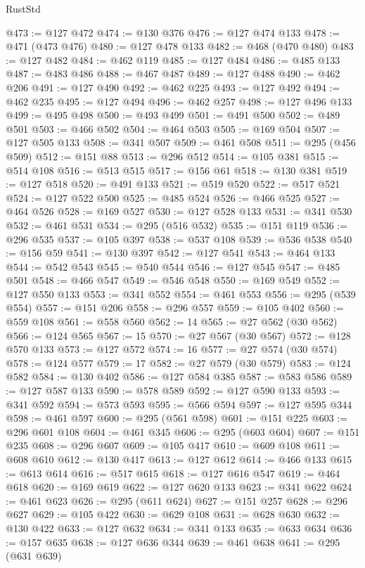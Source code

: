 \begin{lexlean}{RustStd}
\begin{coremodule}
@473 := @127 @472
@474 := @130 @376
@476 := @127 @474 @133
@478 := @471 (@473 @476)
@480 := @127 @478 @133
@482 := @468 (@470 @480)
@483 := @127 @482
@484 := @462 @119
@485 := @127 @484
@486 := @485 @133
@487 := @483 @486
@488 := @467 @487
@489 := @127 @488
@490 := @462 @206
@491 := @127 @490
@492 := @462 @225
@493 := @127 @492
@494 := @462 @235
@495 := @127 @494
@496 := @462 @257
@498 := @127 @496 @133
@499 := @495 @498
@500 := @493 @499
@501 := @491 @500
@502 := @489 @501
@503 := @466 @502
@504 := @464 @503
@505 := @169 @504
@507 := @127 @505 @133
@508 := @341 @507
@509 := @461 @508
@511 := @295 (@456 @509)
@512 := @151 @88
@513 := @296 @512
@514 := @105 @381
@515 := @514 @108
@516 := @513 @515
@517 := @156 @61
@518 := @130 @381
@519 := @127 @518
@520 := @491 @133
@521 := @519 @520
@522 := @517 @521
@524 := @127 @522 @500
@525 := @485 @524
@526 := @466 @525
@527 := @464 @526
@528 := @169 @527
@530 := @127 @528 @133
@531 := @341 @530
@532 := @461 @531
@534 := @295 (@516 @532)
@535 := @151 @119
@536 := @296 @535
@537 := @105 @397
@538 := @537 @108
@539 := @536 @538
@540 := @156 @59
@541 := @130 @397
@542 := @127 @541
@543 := @464 @133
@544 := @542 @543
@545 := @540 @544
@546 := @127 @545
@547 := @485 @501
@548 := @466 @547
@549 := @546 @548
@550 := @169 @549
@552 := @127 @550 @133
@553 := @341 @552
@554 := @461 @553
@556 := @295 (@539 @554)
@557 := @151 @206
@558 := @296 @557
@559 := @105 @402
@560 := @559 @108
@561 := @558 @560
@562 := 14
@565 := @27 @562 (@30 @562)
@566 := @124 @565
@567 := 15
@570 := @27 @567 (@30 @567)
@572 := @128 @570 @133
@573 := @127 @572
@574 := 16
@577 := @27 @574 (@30 @574)
@578 := @124 @577
@579 := 17
@582 := @27 @579 (@30 @579)
@583 := @124 @582
@584 := @130 @402
@586 := @127 @584 @385
@587 := @583 @586
@589 := @127 @587 @133
@590 := @578 @589
@592 := @127 @590 @133
@593 := @341 @592
@594 := @573 @593
@595 := @566 @594
@597 := @127 @595 @344
@598 := @461 @597
@600 := @295 (@561 @598)
@601 := @151 @225
@603 := @296 @601 @108
@604 := @461 @345
@606 := @295 (@603 @604)
@607 := @151 @235
@608 := @296 @607
@609 := @105 @417
@610 := @609 @108
@611 := @608 @610
@612 := @130 @417
@613 := @127 @612
@614 := @466 @133
@615 := @613 @614
@616 := @517 @615
@618 := @127 @616 @547
@619 := @464 @618
@620 := @169 @619
@622 := @127 @620 @133
@623 := @341 @622
@624 := @461 @623
@626 := @295 (@611 @624)
@627 := @151 @257
@628 := @296 @627
@629 := @105 @422
@630 := @629 @108
@631 := @628 @630
@632 := @130 @422
@633 := @127 @632
@634 := @341 @133
@635 := @633 @634
@636 := @157 @635
@638 := @127 @636 @344
@639 := @461 @638
@641 := @295 (@631 @639)

\end{coremodule}
\end{lexlean}
